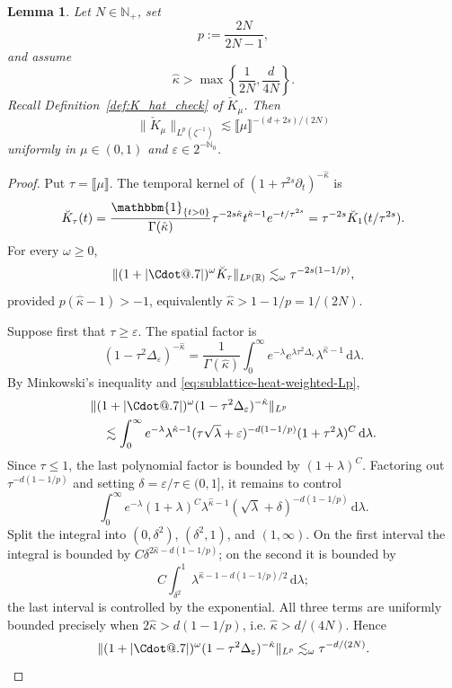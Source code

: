 \documentclass{article}
\makeatletter
\numberwithin{equation}{section}
\newcommand{\assign}{:=}
\newcommand{\mathd}{\mathrm{d}}
\newcommand*\Cdot{{\mathpalette\Cdot@{.7}}}
\newcommand*\Cdot@[2]{\mathbin{\vcenter{\hbox{\scalebox{#2}{\hspace{0.1mm}$\m@th#1\bullet$\hspace{0.1mm}}}}}}
\theoremstyle{plain}
\newtheorem{lemma}[theorem]{Lemma}
\theoremstyle{definition}
\makeatother
\begin{document}
\begin{lemma}
	\label{lem:check-K-factor}
	Let \(N\in\mathbb N_+\), set
	\[
	p\assign\frac{2N}{2N-1},
	\]
	and assume
	\[
	\hat\kappa>
	\max\left\{\frac1{2N},\frac d{4N}\right\}.
	\]
	Recall Definition~\ref{def:K_hat_check} of \(\check K_\mu\). Then
	\begin{equation}
		\label{eq:check-K-piecewise-bound}
		\|\check K_\mu\|_{L^p(\zeta^{-1})}
		\lesssim
		\llbracket\mu\rrbracket^{-(d+2s)/(2N)}
	\end{equation}
	uniformly in \(\mu\in(0,1)\) and
	\(\varepsilon\in2^{-\mathbb N_0}\).
\end{lemma}

\begin{proof}
	Put \(\tau=\llbracket\mu\rrbracket\).  The temporal kernel of
	\((1+\tau^{2s}\partial_t)^{-\hat\kappa}\) is
	\[
	\breve K_\tau(t)
	=
	\frac{\mathbbm{1}_{\{t>0\}}}{\Gamma(\hat\kappa)}
	\tau^{-2s\hat\kappa}
	t^{\hat\kappa-1}e^{-t/\tau^{2s}}
	=
	\tau^{-2s}\breve K_1(t/\tau^{2s}).
	\]
	For every \(\omega\geq0\),
	\[
	\|(1+|\Cdot|)^\omega\breve K_\tau\|_{L^p(\mathbb R)}
	\lesssim_\omega
	\tau^{-2s(1-1/p)},
	\]
	provided
	\(p(\hat\kappa-1)>-1\), equivalently
	\(\hat\kappa>1-1/p=1/(2N)\).
	
	Suppose first that \(\tau\geq\varepsilon\).  The spatial factor is
	\[
	(1-\tau^2\Delta_\varepsilon)^{-\hat\kappa}
	=
	\frac1{\Gamma(\hat\kappa)}
	\int_0^\infty
	e^{-\lambda}
	e^{\lambda\tau^2\Delta_\varepsilon}
	\lambda^{\hat\kappa-1}\,\mathd\lambda.
	\]
	By Minkowski's inequality and
	\eqref{eq:sublattice-heat-weighted-Lp},
	\[
	\begin{aligned}
		&\|(1+|\Cdot|)^\omega
		(1-\tau^2\Delta_\varepsilon)^{-\hat\kappa}
		\|_{L^p}
		\\
		&\quad\lesssim
		\int_0^\infty
		e^{-\lambda}\lambda^{\hat\kappa-1}
		(\tau\sqrt\lambda+\varepsilon)^{-d(1-1/p)}
		(1+\tau^2\lambda)^C\,\mathd\lambda.
	\end{aligned}
	\]
	Since \(\tau\leq1\), the last polynomial factor is bounded by
	\((1+\lambda)^C\).  Factoring out \(\tau^{-d(1-1/p)}\) and setting
	\(\delta=\varepsilon/\tau\in(0,1]\), it remains to control
	\[
	\int_0^\infty
	e^{-\lambda}(1+\lambda)^C
	\lambda^{\hat\kappa-1}
	(\sqrt\lambda+\delta)^{-d(1-1/p)}\,\mathd\lambda.
	\]
	Split the integral into
	\((0,\delta^2)\), \((\delta^2,1)\), and \((1,\infty)\).  On the first interval the
	integral is bounded by \(C\delta^{2\hat\kappa-d(1-1/p)}\); on the second it is
	bounded by
	\[
	C\int_{\delta^2}^1
	\lambda^{\hat\kappa-1-d(1-1/p)/2}\,\mathd\lambda;
	\]
	the last interval is controlled by the exponential.  All three terms are
	uniformly bounded precisely when
	\(2\hat\kappa>d(1-1/p)\), i.e.
	\(\hat\kappa>d/(4N)\).  Hence
	\[
	\|(1+|\Cdot|)^\omega
	(1-\tau^2\Delta_\varepsilon)^{-\hat\kappa}
	\|_{L^p}
	\lesssim_\omega
	\tau^{-d/(2N)}.
	\]
	

\end{proof}
\end{document}
